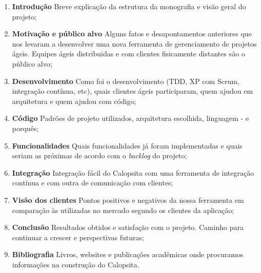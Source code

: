 \documentclass[titlepage]{article}
\begin{document}
\begin{enumerate}
	\item{\textbf{Introdução} Breve explicação da estrutura da monografia e visão geral do projeto;}
	\item{\textbf{Motivação e público alvo} Alguns fatos e desapontamentos anteriores que nos levaram a desenvolver uma nova ferramenta de gerenciamento de projetos ágeis. Equipes ágeis distribuidas e com clientes fisicamente distantes são o público alvo;}
	\item{\textbf{Desenvolvimento} Como foi o desenvolvimento (TDD, XP com Scrum, integração contínua, etc), quais clientes ágeis participaram, quem ajudou em arquitetura e quem ajudou com código;}
	\item{\textbf{Código} Padrões de projeto utilizados, arquitetura escolhida, linguagem - e porquês;}
	\item{\textbf{Funcionalidades} Quais funcionalidades já foram implementadas e quais seriam as próximas de acordo com o \textit{backlog} do projeto;}
	\item{\textbf{Integração} Integração fácil do Calopsita com uma ferramenta de integração contínua e com outra de comunicação com clientes;}
	\item{\textbf{Visão dos clientes} Pontos positivos e negativos da nossa ferramenta em comparação às utilizadas no mercado segundo os clientes da aplicação;}
	\item{\textbf{Conclusão} Resultados obtidos e satisfação com o projeto. Caminho para continuar a crescer e perspectivas futuras;}
	\item{\textbf{Bibliografia} Livros, websites e publicações acadêmicas onde procuramos informações na construção do Calopsita.}
\end{enumerate}
\end{document}
